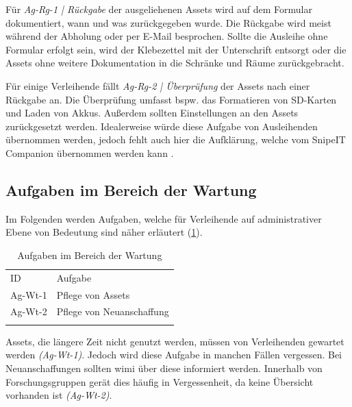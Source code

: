 Für \textit{Ag-Rg-1 | Rückgabe} der ausgeliehenen Assets wird auf dem Formular dokumentiert, wann
und was zurückgegeben wurde. Die Rückgabe wird meist während der Abholung oder per E-Mail
besprochen. Sollte die Ausleihe ohne Formular erfolgt sein, wird der Klebezettel mit der
Unterschrift entsorgt oder die Assets ohne weitere Dokumentation in die Schränke und Räume
zurückgebracht.

Für einige Verleihende fällt \textit{Ag-Rg-2 | Überprüfung} der Assets nach einer Rückgabe an. Die
Überprüfung umfasst bspw. das Formatieren von SD-Karten und Laden von Akkus. Außerdem sollten
Einstellungen an den Assets zurückgesetzt werden. Idealerweise würde diese Aufgabe von Ausleihenden
übernommen werden, jedoch fehlt auch hier die Aufklärung, welche vom SnipeIT Companion übernommen
werden kann .
\subsection{Aufgaben im Bereich der Wartung}
\label{subsec:wartung}
Im Folgenden werden Aufgaben, welche für Verleihende auf administrativer Ebene von Bedeutung sind
näher erläutert (\ref{table:Ag-Wt}).

\begin{table}[h]
        \centering
        \caption{Aufgaben im Bereich der Wartung}
        \begin{tabular}{ll}
                \arrayrulecolor{maincolor}\hline
                \sffamily\color{maincolor}ID & \sffamily\color{maincolor}Aufgabe \\
                \arrayrulecolor{maincolor}\hline
                Ag-Wt-1                      & Pflege von Assets \\
                Ag-Wt-2                      & Pflege von Neuanschaffung \\
                \arrayrulecolor{maincolor}\hline
        \end{tabular}
        \label{table:Ag-Wt}
\end{table}

Assets, die längere Zeit nicht genutzt werden, müssen von Verleihenden gewartet werden
\textit{(Ag-Wt-1)}. Jedoch wird diese Aufgabe in manchen Fällen vergessen. Bei Neuanschaffungen
sollten \ac{wimi} über diese informiert werden. Innerhalb von Forschungsgruppen gerät dies häufig in
Vergessenheit, da keine Übersicht vorhanden ist \textit{(Ag-Wt-2)}.



